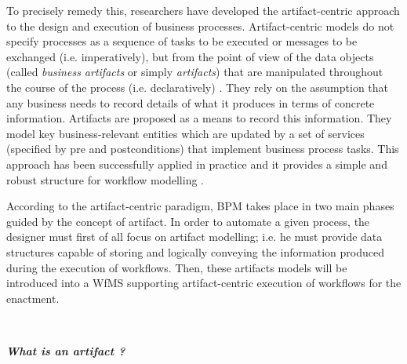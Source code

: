 To precisely remedy this, researchers have developed the artifact-centric \cite{nigam2003business} approach to the design and execution of business processes. Artifact-centric models do not specify processes as a sequence of tasks to be executed or messages to be exchanged (i.e. imperatively), but from the point of view of the data objects (called \textit{business artifacts} or simply \textit{artifacts}) that are manipulated throughout the course of the process (i.e. declaratively) \cite{lohmann2011artifact}. They rely on the assumption that any business needs to record details of what it produces in terms of concrete information. Artifacts are proposed as a means to record this information. They model key business-relevant entities which are updated by a set of services (specified by pre and postconditions) that implement business process tasks. This approach has been successfully applied in practice and it provides a simple and robust structure for workflow modelling \cite{estanol2012artifact}.



\label{chap1:sec:artifact-centric-bpm-approach}
According to the artifact-centric paradigm, BPM takes place in two main phases guided by the concept of artifact. In order to automate a given process, the designer must first of all focus on artifact modelling; i.e. he must provide data structures capable of storing and logically conveying the information produced during the execution of workflows. Then, these artifacts models will be introduced into a WfMS supporting artifact-centric execution of workflows for the enactment.

~

\noindent\textbf{\textit{What is an artifact ?}}


